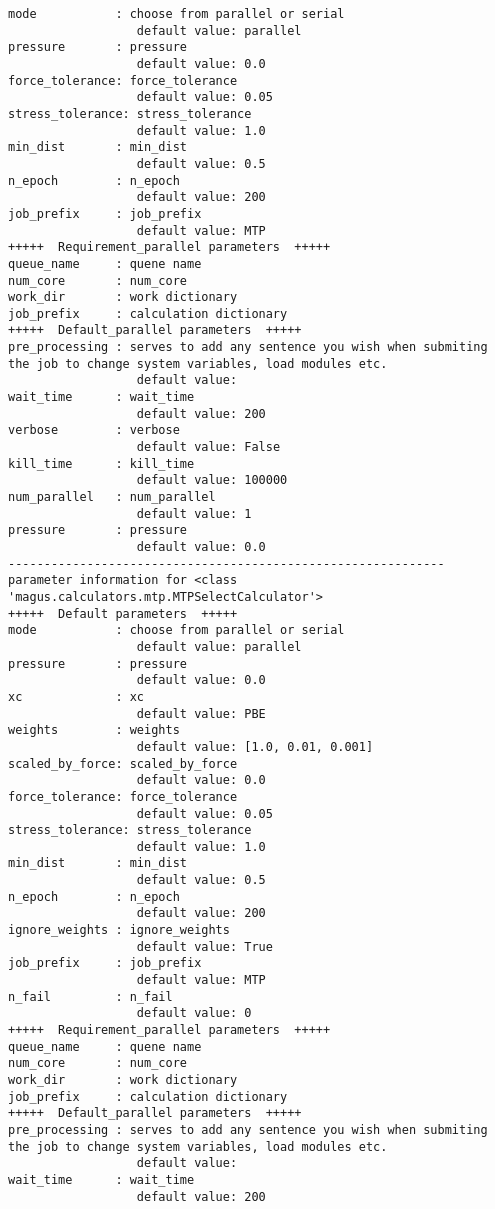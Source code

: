 \documentclass[12pt,oneside]{book}
\begin{document}
\begin{tcolorbox}
\begin{verbatim}
mode           : choose from parallel or serial
                  default value: parallel
pressure       : pressure
                  default value: 0.0
force_tolerance: force_tolerance
                  default value: 0.05
stress_tolerance: stress_tolerance
                  default value: 1.0
min_dist       : min_dist
                  default value: 0.5
n_epoch        : n_epoch
                  default value: 200
job_prefix     : job_prefix
                  default value: MTP
+++++  Requirement_parallel parameters  +++++
queue_name     : quene name
num_core       : num_core
work_dir       : work dictionary
job_prefix     : calculation dictionary
+++++  Default_parallel parameters  +++++
pre_processing : serves to add any sentence you wish when submiting the job to change system variables, load modules etc.
                  default value: 
wait_time      : wait_time
                  default value: 200
verbose        : verbose
                  default value: False
kill_time      : kill_time
                  default value: 100000
num_parallel   : num_parallel
                  default value: 1
pressure       : pressure
                  default value: 0.0
-------------------------------------------------------------
parameter information for <class 'magus.calculators.mtp.MTPSelectCalculator'>
+++++  Default parameters  +++++
mode           : choose from parallel or serial
                  default value: parallel
pressure       : pressure
                  default value: 0.0
xc             : xc
                  default value: PBE
weights        : weights
                  default value: [1.0, 0.01, 0.001]
scaled_by_force: scaled_by_force
                  default value: 0.0
force_tolerance: force_tolerance
                  default value: 0.05
stress_tolerance: stress_tolerance
                  default value: 1.0
min_dist       : min_dist
                  default value: 0.5
n_epoch        : n_epoch
                  default value: 200
ignore_weights : ignore_weights
                  default value: True
job_prefix     : job_prefix
                  default value: MTP
n_fail         : n_fail
                  default value: 0
+++++  Requirement_parallel parameters  +++++
queue_name     : quene name
num_core       : num_core
work_dir       : work dictionary
job_prefix     : calculation dictionary
+++++  Default_parallel parameters  +++++
pre_processing : serves to add any sentence you wish when submiting the job to change system variables, load modules etc.
                  default value: 
wait_time      : wait_time
                  default value: 200

\end{verbatim}
\end{tcolorbox}
\end{document}
